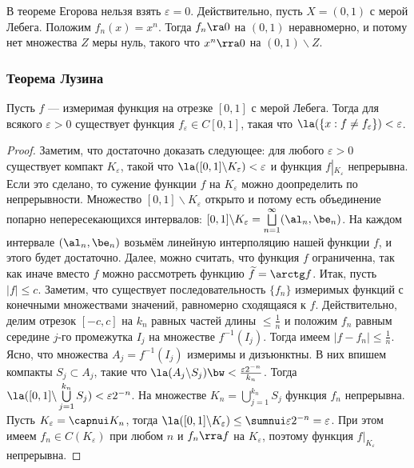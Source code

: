 \documentclass[10pt]{article}
\newcommand{\ve}{\varepsilon}
\begin{document}
\begin{note}
В теореме Егорова нельзя взять $\ve=0$. Действительно, пусть
$X=(0,1)$ с мерой Лебега. Положим $f_n(x)=x^n$. Тогда $f_n\ra0$ на
$(0,1)$ неравномерно, и потому нет множества $Z$ меры нуль, такого
что $x^n\rra0$ на $(0,1)\backslash Z$.
\end{note}

\subsubsection{Теорема Лузина}

\begin{theorem}[Лузин]
Пусть $f$ --- измеримая функция на отрезке $[0,1]$ с мерой Лебега.
Тогда для всякого $\ve>0$ существует функция $f_\ve\in C[0,1]$,
такая что $\la(\{x:f\ne f_\ve\})<\ve$.
\end{theorem}

\begin{proof}
Заметим, что достаточно доказать следующее: для любого $\ve>0$
существует компакт $K_\ve$, такой что $\la([0,1]\backslash
K_\ve)<\ve$ и функция $f\left|_{K_\ve}\right.$ непрерывна. Если это
сделано, то сужение функции $f$ на $K_\ve$ можно доопределить по
непрерывности. Множество $[0,1]\backslash K_\ve$ открыто и потому
есть объединение попарно непересекающихся интервалов:
$[0,1]\backslash K_\ve=\bigsqcup\limits_{n=1}^\infty(\al_n,\be_n)$.
На каждом интервале $(\al_n,\be_n)$ возьмём линейную интерполяцию
нашей функции $f$, и этого будет достаточно. Далее, можно считать,
что функция $f$ ограниченна, так как иначе вместо $f$ можно
рассмотреть функцию $\widetilde f=\arctg f$. Итак, пусть $|f|\le c$.
Заметим, что существует последовательность $\{f_n\}$ измеримых
функций с конечными множествами значений, равномерно сходящаяся к
$f$. Действительно, делим отрезок $[-c,c]$ на $k_n$ равных частей
длины $\le\frac1n$ и положим $f_n$ равным середине $j$-го промежутка
$I_j$ на множестве $f^{-1}(I_j)$. Тогда имеем $|f-f_n|\le\frac1n$.
Ясно, что множества $A_j=f^{-1}(I_j)$ измеримы и дизъюнктны. В них
впишем компакты $S_j\subset A_j$, такие что $\la(A_j\backslash
S_j)\bw <\frac{\ve2^{-n}}{k_n}$. Тогда
$\la([0,1]\backslash\bigcup\limits_{j=1}^{k_n} S_j)<\ve2^{-n}$. На
множестве $K_n=\bigcup\limits_{j=1}^{k_n}S_j$ функция $f_n$
непрерывна. Пусть $K_\ve=\capnui K_n$, тогда $\la([0,1]\backslash
K_\ve)\le\sumnui\ve2^{-n}=\ve$. При этом имеем $f_n\in C(K_\ve)$ при
любом $n$ и $f_n\rra f$ на $K_\ve$, поэтому функция
$\left.f\right|_{K_\ve}$ непрерывна.
\end{proof}
\end{document}
